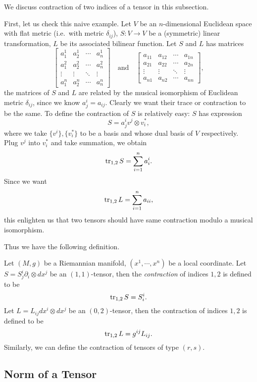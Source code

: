 We discuss contraction of two indices of a tensor in this subsection.

First, let us check this naive example.
Let $V$ be an $n$-dimensional Euclidean space with flat metric (i.e.\ with metric $\delta_{ij}$), $S:V\to V$ be a (symmetric) linear transformation, $L$ be its associated bilinear function.
Let $S$ and $L$ has matrices
\[\begin{bmatrix}
    a^1_1 & a^1_2 & \cdots & a^1_n \\
    a^2_1 & a^2_2 & \cdots & a^2_n \\
    \vdots & \vdots & \ddots & \vdots \\
    a^n_1 & a^n_2 & \cdots & a^n_n
\end{bmatrix}\quad\text{and}\quad\begin{bmatrix}
    a_{11} & a_{12} & \cdots & a_{1n} \\
    a_{21} & a_{22} & \cdots & a_{2n} \\
    \vdots & \vdots & \ddots & \vdots \\
    a_{n1} & a_{n2} & \cdots & a_{nn}
\end{bmatrix},\]
the matrices of $S$ and $L$ are related by the musical isomorphism of Euclidean metric $\delta_{ij}$, since we know $a^i_j=a_{ij}$.
Clearly we want their trace or contraction to be the same.
To define the contraction of $S$ is relatively easy: $S$ has expression
\[S=a^i_jv^j\otimes v_i^*,\]
where we take $\{v^i\},\{v_i^*\}$ to be a basis and whose dual basis of $V$ respectively.
Plug $v^j$ into $v_i^*$ and take summation, we obtain
\[\operatorname{tr}_{1,2}S=\sum_{i=1}^na^i_i.\]
Since we want
\[\operatorname{tr}_{1,2}L=\sum_{i=1}^na_{ii},\]
this enlighten us that two tensors should have same contraction modulo a musical isomorphism.

Thus we have the following definition.
\begin{defn}
    Let $(M,g)$ be a Riemannian manifold, $(x^1,\cdots,x^n)$ be a local coordinate.
    Let $S=S^i_j\partial_i\otimes dx^j$ be an $(1,1)$-tensor, then the \emph{contraction} of indices $1,2$ is defined to be
    \[\operatorname{tr}_{1,2}S=S^i_i.\]
    Let $L=L_{ij}dx^i\otimes dx^j$ be an $(0,2)$-tensor, then the contraction of indices $1,2$ is defined to be
    \[\operatorname{tr}_{1,2}L=g^{ij}L_{ij}.\]
    Similarly, we can define the contraction of tensors of type $(r,s)$.
\end{defn}

\subsection{Norm of a Tensor}

